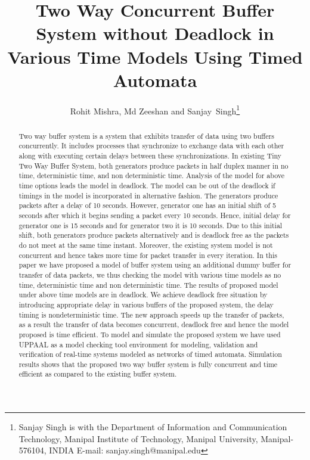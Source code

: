 \documentclass[letterpaper]{article}
\begin{document}
\title{Two Way Concurrent Buffer System without Deadlock in Various Time Models Using Timed Automata}
\author{Rohit Mishra, Md Zeeshan and Sanjay~Singh\thanks {Sanjay Singh is with the Department of Information and Communication Technology, Manipal Institute of Technology, Manipal University, Manipal-576104, INDIA \hspace{5cm}E-mail: sanjay.singh@manipal.edu}}

\maketitle

\begin{abstract}
Two way buffer system is a system that exhibits transfer of data using two buffers concurrently. It includes processes that synchronize to exchange data with each other along with executing certain delays between these synchronizations. In existing Tiny Two Way Buffer System, both generators produce packets in half duplex manner in no time, deterministic time, and non deterministic time. Analysis of the model for above time options leads the model in deadlock. The model can be out of the deadlock if timings in the model is incorporated in alternative fashion. The generators produce packets after a delay of 10 seconds. However, generator one has an initial shift of 5 seconds after which it begins sending a packet every 10 seconds. Hence, initial delay for generator one is 15 seconds and for generator two it is 10 seconds. Due to this initial shift, both generators produce packets alternatively and is deadlock free as the packets do not meet at the same time instant. Moreover, the existing system model is not concurrent and hence takes more time for packet transfer in every iteration. In this paper we have proposed a model of buffer system using an additional dummy buffer for transfer of data packets, we thus checking the model with various time models as no time, deterministic time and non deterministic time. The results of proposed model under above time models are in deadlock. We achieve deadlock free situation by introducing appropriate delay in various buffers of the proposed system, the delay timing is nondeterministic time. The new approach speeds up the transfer of packets, as a result the transfer of data becomes concurrent, deadlock free and hence the model proposed is time efficient. To model and simulate the proposed system we have used UPPAAL as a model checking tool environment for modeling, validation and verification of real-time systems modeled as networks of timed automata. Simulation results shows that the proposed two way buffer system is fully concurrent and time efficient as compared to the existing buffer system.
\end{abstract}
\end{document}
